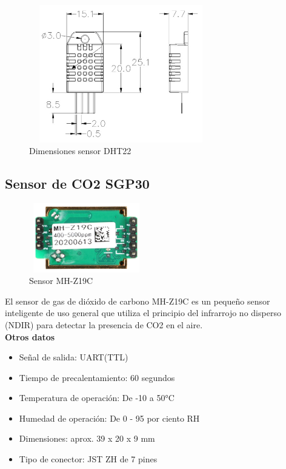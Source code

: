 \begin{figure}[H]
    \centering
    \includegraphics[width=8cm, height=6cm]{imagenes/dht22 dimensiones.jpg}
    \caption{Dimensiones sensor DHT22}
    \label{imag:dimensiones_dht22}
\end{figure}

\vspace{1cm}

\subsection{Sensor de CO2 SGP30}

\begin{figure}[H]
      \centering
      \includegraphics[width=5cm, height=3cm]{imagenes/mh-z19c.png}
      \caption{Sensor MH-Z19C}
      \label{imag:mh-z19c}
   \end{figure}

El sensor de gas de dióxido de carbono MH-Z19C es un pequeño sensor inteligente de uso general que utiliza el principio del infrarrojo no disperso (NDIR) para detectar la presencia de CO2 en el aire.\\

\textbf{Otros datos}
\begin{itemize}
    \item Señal de salida: UART(TTL)
    \item Tiempo de precalentamiento: 60 segundos
    \item Temperatura de operación: De -10 a 50°C
    \item Humedad de operación: De 0 - 95 por ciento RH
    \item Dimensiones: aprox. 39 x 20 x 9 mm
    \item Tipo de conector: JST ZH de 7 pines
\end{itemize}

